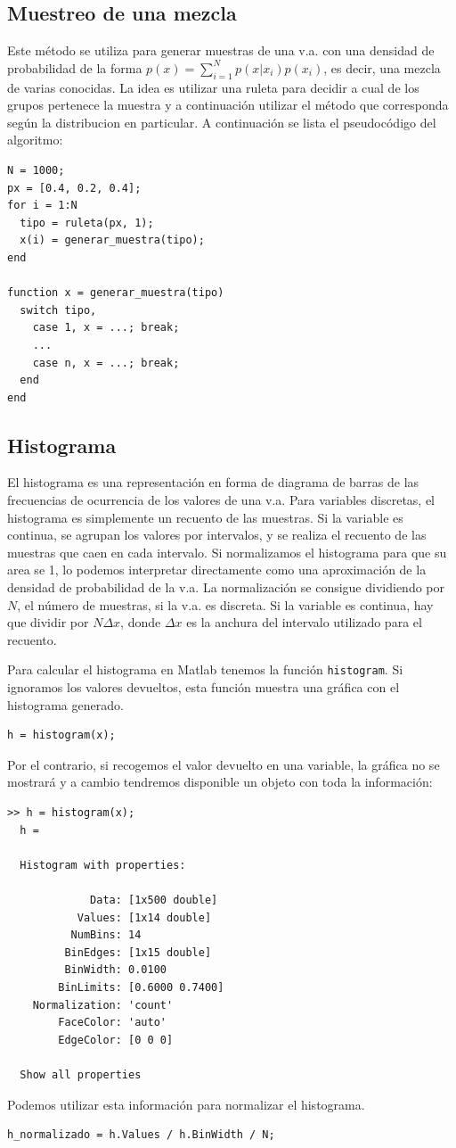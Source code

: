 \documentclass[10pt,twoside,spanish,a4paper]{article}
\begin{document}
\subsection*{Muestreo de una mezcla}
Este método se utiliza para generar muestras de una v.a. con una densidad de probabilidad de la forma $p(x) = \sum_{i=1}^{N}p(x|x_i)p(x_i)$, es decir,
una mezcla de varias conocidas. La idea es utilizar una ruleta para decidir a cual de los grupos pertenece la muestra y a continuación utilizar
el método que corresponda según la distribucion en particular. A continuación se lista el pseudocódigo del algoritmo:
\begin{lstlisting}
N = 1000;
px = [0.4, 0.2, 0.4];
for i = 1:N
  tipo = ruleta(px, 1);
  x(i) = generar_muestra(tipo);
end

function x = generar_muestra(tipo)
  switch tipo,
    case 1, x = ...; break;
    ...
    case n, x = ...; break;
  end
end
\end{lstlisting}

\subsection*{Histograma}
El histograma es una representación en forma de diagrama de barras de las frecuencias de ocurrencia de los valores de una v.a. 
Para variables discretas, el histograma es simplemente un recuento de las muestras. Si la variable es continua, se agrupan los valores 
por intervalos, y se realiza el recuento de las muestras que caen en cada intervalo. Si normalizamos el histograma para que su 
area se 1, lo podemos interpretar directamente como una aproximación de la densidad de probabilidad de la v.a.
La normalización se consigue dividiendo por $N$, el número de muestras, si la v.a. es discreta. Si la variable es continua,
hay que dividir por $N\Delta x$, donde $\Delta x$ es la anchura del intervalo utilizado para el recuento.

Para calcular el histograma en Matlab tenemos la función \texttt{histogram}. Si ignoramos los valores devueltos, esta función muestra 
una gráfica con el histograma generado. 
\begin{lstlisting}
h = histogram(x);
\end{lstlisting}
Por el contrario, si recogemos el valor devuelto en una variable, la gráfica no se mostrará y a cambio tendremos disponible un objeto con
toda la información:
\begin{lstlisting}
>> h = histogram(x);
  h = 

  Histogram with properties:

             Data: [1x500 double]
           Values: [1x14 double]
          NumBins: 14
         BinEdges: [1x15 double]
         BinWidth: 0.0100
        BinLimits: [0.6000 0.7400]
    Normalization: 'count'
        FaceColor: 'auto'
        EdgeColor: [0 0 0]

  Show all properties
\end{lstlisting}
Podemos utilizar esta información para normalizar el histograma.
\begin{lstlisting}
h_normalizado = h.Values / h.BinWidth / N;
\end{lstlisting}
\end{document}
